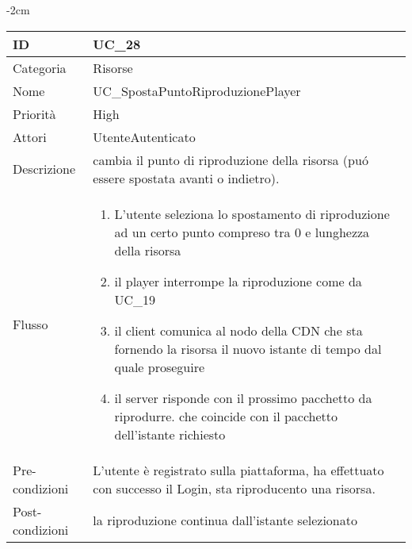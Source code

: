 \begin{center}
\begin{table}[bp]
    \centering
    \addtolength{\leftskip} {-2cm}
\begin{tabular}{ |p{2.6cm}|p{13cm}|  }
\hline
ID & UC\_28 \\\hline
Categoria & Risorse\\\hline
Nome & UC\_SpostaPuntoRiproduzionePlayer\\\hline
Priorità & High \\\hline
Attori &  UtenteAutenticato \\\hline
Descrizione & cambia il punto di riproduzione della risorsa (pu\'o essere spostata avanti o indietro).\\\hline
Flusso &  	\begin{enumerate}
			\item L'utente seleziona lo spostamento di riproduzione ad un certo punto compreso tra 0 e lunghezza della risorsa
			\item il player interrompe la riproduzione come da UC\_19
			\item il client comunica al nodo della CDN che sta fornendo la risorsa il nuovo istante di tempo dal quale proseguire
			\item il server risponde con il prossimo pacchetto da riprodurre. che coincide con il pacchetto dell'istante richiesto
		\end{enumerate}
			\\\hline
Pre-condizioni & L'utente è registrato sulla piattaforma, ha effettuato con successo il Login, sta riproducento una risorsa.\\\hline
Post-condizioni & la riproduzione continua dall'istante selezionato\\\hline
\end{tabular}
\label{table_use_case:28}\newline
\end{table}



\end{center}
